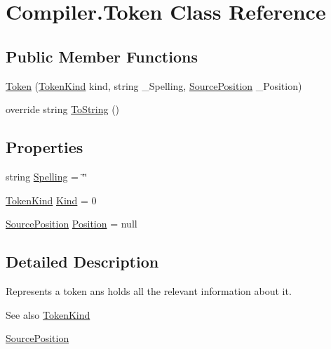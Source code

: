 \hypertarget{class_compiler_1_1_token}{}\section{Compiler.\+Token Class Reference}
\label{class_compiler_1_1_token}
\subsection*{Public Member Functions}
\begin{DoxyCompactItemize}
\item 
\mbox{\hyperlink{class_compiler_1_1_token_aab9c8427bb691c0e674d0f1fdd5b1fbd}{Token}} (\mbox{\hyperlink{namespace_compiler_a57929962f25004759596fc3f13cf563c}{Token\+Kind}} kind, string \+\_\+\+Spelling, \mbox{\hyperlink{class_compiler_1_1_source_position}{Source\+Position}} \+\_\+\+Position)
\item 
override string \mbox{\hyperlink{class_compiler_1_1_token_aa5b0e895da0a0f75886eb603455ab0ea}{To\+String}} ()
\end{DoxyCompactItemize}
\subsection*{Properties}
\begin{DoxyCompactItemize}
\item 
string \mbox{\hyperlink{class_compiler_1_1_token_af1d95b32f5d1b3f103a10c11ac2f2ac2}{Spelling}} = \char`\"{}\char`\"{}
\item 
\mbox{\hyperlink{namespace_compiler_a57929962f25004759596fc3f13cf563c}{Token\+Kind}} \mbox{\hyperlink{class_compiler_1_1_token_a181f032615da51df5a5a0223532cfe9f}{Kind}} = 0
\item 
\mbox{\hyperlink{class_compiler_1_1_source_position}{Source\+Position}} \mbox{\hyperlink{class_compiler_1_1_token_aefe43b7285f8982f636556b611cdbd5e}{Position}} = null
\end{DoxyCompactItemize}


\subsection{Detailed Description}
Represents a token ans holds all the relevant information about it. \begin{DoxySeeAlso}{See also}
\mbox{\hyperlink{namespace_compiler_a57929962f25004759596fc3f13cf563c}{Token\+Kind}} 

\mbox{\hyperlink{class_compiler_1_1_source_position}{Source\+Position}} 
\end{DoxySeeAlso}


